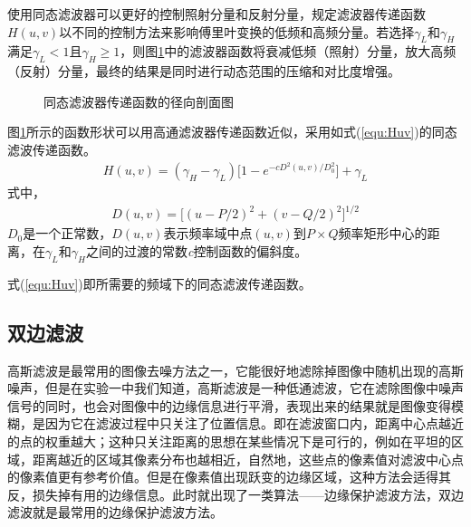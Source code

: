 \documentclass{hitreport}
\begin{document}
使用同态滤波器可以更好的控制照射分量和反射分量，规定滤波器传递函数$H\left(u,v\right)$以不同的控制方法来影响傅里叶变换的低频和高频分量。若选择$\gamma_L$和$\gamma_H$满足$\gamma_L<1$且$\gamma_H\ge 1$，则图\ref{fig:F}中的滤波器函数将衰减低频（照射）分量，放大高频（反射）分量，最终的结果是同时进行动态范围的压缩和对比度增强。

\begin{figure}[H]
\centering
{}
\caption{同态滤波器传递函数的径向剖面图}\label{fig:F}
\end{figure}


图\ref{fig:F}所示的函数形状可以用高通滤波器传递函数近似，采用如式(\ref{equ:Huv})的同态滤波传递函数。
\begin{align}\label{equ:Huv}
H\left(u,v\right) = \left(\gamma_H-\gamma_L\right)\Big[1-e^{\left. -cD^2\left(u,v\right)/D_0^2 \right.}\Big] + \gamma_L
\end{align}
式中，
\begin{align}
D\left(u,v\right) = \Big[\left(u-\left.P/2\right.\right)^2 + \left(v-\left.Q/2\right.\right)^2\Big]^{\left.1/2\right.}
\end{align}
$D_0$是一个正常数，$D\left(u,v\right)$表示频率域中点$\left(u,v\right)$到$P\times Q$频率矩形中心的距离，在$\gamma_L$和$\gamma_H$之间的过渡的常数\textit{c}控制函数的偏斜度。

式(\ref{equ:Huv})即所需要的频域下的同态滤波传递函数。


\subsection{双边滤波}\label{sec:shuangbian}

高斯滤波是最常用的图像去噪方法之一，它能很好地滤除掉图像中随机出现的高斯噪声，但是在实验一中我们知道，高斯滤波是一种低通滤波，它在滤除图像中噪声信号的同时，也会对图像中的边缘信息进行平滑，表现出来的结果就是图像变得模糊，是因为它在滤波过程中只关注了位置信息。即在滤波窗口内，距离中心点越近的点的权重越大；这种只关注距离的思想在某些情况下是可行的，例如在平坦的区域，距离越近的区域其像素分布也越相近，自然地，这些点的像素值对滤波中心点的像素值更有参考价值。但是在像素值出现跃变的边缘区域，这种方法会适得其反，损失掉有用的边缘信息。此时就出现了一类算法——边缘保护滤波方法，双边滤波就是最常用的边缘保护滤波方法。
\end{document}
